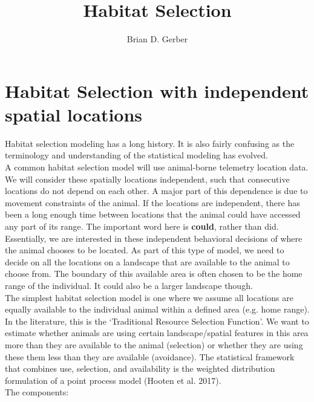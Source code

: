 \documentclass[12pt]{article}
\title{Habitat Selection}
\author{Brian D. Gerber}
\begin{document}
\maketitle
\section{Habitat Selection with independent spatial locations}

Habitat selection modeling has a long history. It is also fairly confusing as the terminology and understanding of the statistical modeling has evolved. \\

A common habitat selection model will use animal-borne telemetry location data. We will consider these spatially locations independent, such that consecutive locations do not depend on each other. A major part of this dependence is due to movement constraints of the animal. If the locations are independent, there has been a long enough time between locations that the animal could have accessed any part of its range. The important word here is \textbf{could}, rather than did. Essentially, we are interested in these independent behavioral decisions of where the animal chooses to be located. As part of this type of model, we need to decide on all the locations on a landscape that are available to the animal to choose from. The boundary of this available area is often chosen to be the home range of the individual. It could also be a larger landscape though. \\

The simplest habitat selection model is one where we assume all locations are equally available to the individual animal within a defined area (e.g. home range). In the literature, this is the `Traditional Resource Selection Function'. We want to estimate whether animals are using certain landscape/spatial features in this area more than they are available to the animal (selection) or whether they are using these them less than they are available (avoidance). The statistical framework that combines use, selection, and availability is the weighted distribution formulation of a point process model (Hooten et al. 2017).\\

The components:
\end{document}
